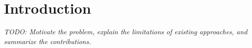 \section{Introduction}
\label{sec:introduction}
\textit{TODO: Motivate the problem, explain the limitations of existing
approaches, and summarize the contributions.}
